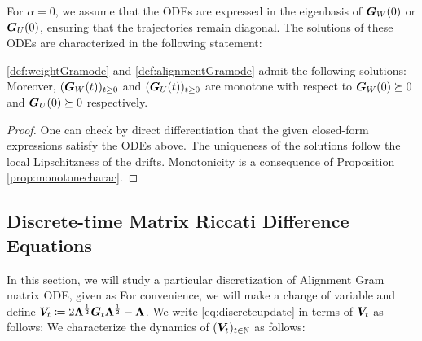 For $\alpha = 0$, we assume that the ODEs are expressed in the eigenbasis of $\boldsymbol{G}_W(0)$ or $\boldsymbol{G}_U(0)$, ensuring that the trajectories remain diagonal. The solutions of these ODEs are characterized in the following statement:

\begin{lemma} 
\label{lem:riccsolution}
\eqref{def:weightGramode}  and \eqref{def:alignmentGramode} admit the following solutions:
Moreover,    $( \boldsymbol{G}_{W}(t) )_{t \geq 0}$ and   $(\boldsymbol{G}_{U}(t) )_{t \geq 0}$ are monotone with respect to  $\boldsymbol{G}_{W}(0)  \succeq 0$ and $\boldsymbol{G}_{U}(0)  \succeq 0$ respectively.
\end{lemma}

\begin{proof}
 One can check by direct differentiation that the given closed-form expressions satisfy the ODEs above. The uniqueness of the solutions follow the local Lipschitzness of the drifts. Monotonicity is a consequence of Proposition \ref{prop:monotonecharac}.
\end{proof}
 


\subsection{Discrete-time Matrix Riccati Difference Equations}
In this section, we will study a particular discretization of Alignment Gram matrix ODE, given as
For convenience, we will make a change of variable and define $\boldsymbol{V}_t \coloneqq   2 \boldsymbol{\Lambda}^{\frac{1}{2}} \boldsymbol{G}_t  \boldsymbol{\Lambda}^{\frac{1}{2}}  - \boldsymbol{\Lambda}$. We write  \eqref{eq:discreteupdate} in terms of $\boldsymbol{V}_t$ as follows:
We characterize the dynamics of $(\boldsymbol{V}_t)_{t \in \mathbb{N}}$ as follows:



